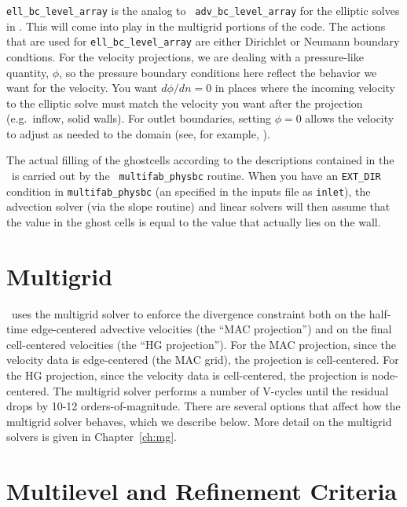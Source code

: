{\tt ell\_bc\_level\_array} is the analog to {\tt
  adv\_bc\_level\_array} for the elliptic solves in \maestro.  This
will come into play in the multigrid portions of the code.  The
actions that are used for {\tt ell\_bc\_level\_array} are either
Dirichlet or Neumann boundary condtions.  For the velocity
projections, we are dealing with a pressure-like quantity, $\phi$, so
the pressure boundary conditions here reflect the behavior we want for
the velocity.  You want $d\phi/dn=0$ in places where the incoming
velocity to the elliptic solve must match the velocity you want after
the projection (e.g.\ inflow, solid walls).  For outlet boundaries,
setting $\phi = 0$ allows the velocity to adjust as needed to the
domain (see, for example, \cite{almgrenBellSzymczak:1996}).

The actual filling of the ghostcells according to the descriptions
contained in the \bctower\ is carried out by the {\tt
  multifab\_physbc} routine.  When you have an {\tt EXT\_DIR}
condition in {\tt multifab\_physbc} (an specified in the inputs file
as {\tt inlet}), the advection solver (via the slope routine) and
linear solvers will then assume that the value in the ghost cells is
equal to the value that actually lies on the wall.






\section{Multigrid}

\maestro\ uses the multigrid solver to enforce the divergence
constraint both on the half-time edge-centered advective velocities
(the ``MAC projection'') and on the final cell-centered velocities
(the ``HG projection'').  For the MAC projection, since the velocity
data is edge-centered (the MAC grid), the projection is cell-centered.
For the HG projection, since the velocity data is cell-centered, the
projection is node-centered.   The
multigrid solver performs a number of V-cycles until the residual
drops by 10-12 orders-of-magnitude.  There are several options that
affect how the multigrid solver behaves, which we describe below.
More detail on the multigrid solvers is given in Chapter~\ref{ch:mg}.


\section{Multilevel and Refinement Criteria}


